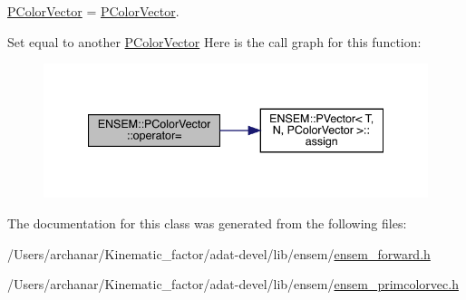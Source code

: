 \mbox{\hyperlink{classENSEM_1_1PColorVector}{P\+Color\+Vector}} = \mbox{\hyperlink{classENSEM_1_1PColorVector}{P\+Color\+Vector}}. 

Set equal to another \mbox{\hyperlink{classENSEM_1_1PColorVector}{P\+Color\+Vector}} Here is the call graph for this function\+:
\nopagebreak
\begin{figure}[H]
\begin{center}
\leavevmode
\includegraphics[width=340pt]{de/dfe/classENSEM_1_1PColorVector_ac5919a92dade0bb7763353ed7d05b8b2_cgraph}
\end{center}
\end{figure}


The documentation for this class was generated from the following files\+:\begin{DoxyCompactItemize}
\item 
/\+Users/archanar/\+Kinematic\+\_\+factor/adat-\/devel/lib/ensem/\mbox{\hyperlink{adat-devel_2lib_2ensem_2ensem__forward_8h}{ensem\+\_\+forward.\+h}}\item 
/\+Users/archanar/\+Kinematic\+\_\+factor/adat-\/devel/lib/ensem/\mbox{\hyperlink{adat-devel_2lib_2ensem_2ensem__primcolorvec_8h}{ensem\+\_\+primcolorvec.\+h}}\end{DoxyCompactItemize}
